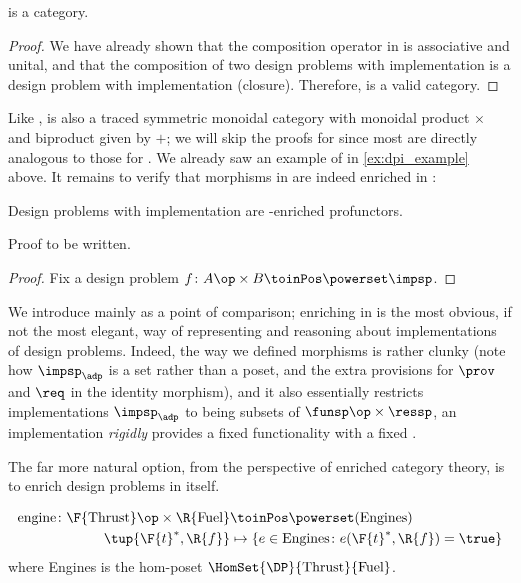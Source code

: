 \begin{lemma}
    \DPI is a category.
\end{lemma}

\begin{proof}
    We have already shown that the composition operator in \DPI is associative and unital, and that the composition of two design problems with implementation is a design problem with implementation (closure).
    Therefore, \DPI is a valid category.
\end{proof}

Like \DP, \DPI is also a traced symmetric monoidal category with monoidal product $\times$ and biproduct given by $+$; we will skip the proofs for \DPI since most are directly analogous to those for \DP.
We already saw an example of \DPI in \cref{ex:dpi_example} above.
It remains to verify that morphisms in \DPI are indeed enriched in \Set:

\begin{proposition}
    Design problems with implementation are \Set-enriched profunctors.
\end{proposition}
\begin{publictodo}
    Proof to be written.
\end{publictodo}
\begin{proof}
    Fix a design problem $f \colon A\op \times B \toinPos \powerset \impsp$.
\end{proof}
We introduce \DPI mainly as a point of comparison; enriching in \Set is the most obvious, if not the most elegant, way of representing and reasoning about implementations of design problems.
Indeed, the way we defined morphisms is rather clunky (note how $\impsp_\adp$ is a set rather than a poset, and the extra provisions for $\prov$ and $\req$ in the identity morphism), and it also essentially restricts implementations $\impsp_\adp$ to being subsets of $\funsp\op \times \ressp$, \ie  an implementation \emph{rigidly} provides a fixed functionality \fun with a fixed \res.

The far more natural option, from the perspective of enriched category theory, is to enrich design problems in \DP itself.

\begin{example}
    \begin{equation}
        \begin{aligned}
            \text{engine} \colon \F{\text{Thrust}}\op \times \R{\text{Fuel}} & \toinPos \powerset(\text{Engines}) \\
            \tup{\F{t}^*,\R{f}}                                              & \mapsto \{ e \in \text{Engines} \colon e(\F{t}^*, \R{f}) = \true \}
        \end{aligned}
    \end{equation}
    where Engines is the hom-poset $\HomSet{\DP}{\text{Thrust}}{\text{Fuel}}$.
\end{example}

